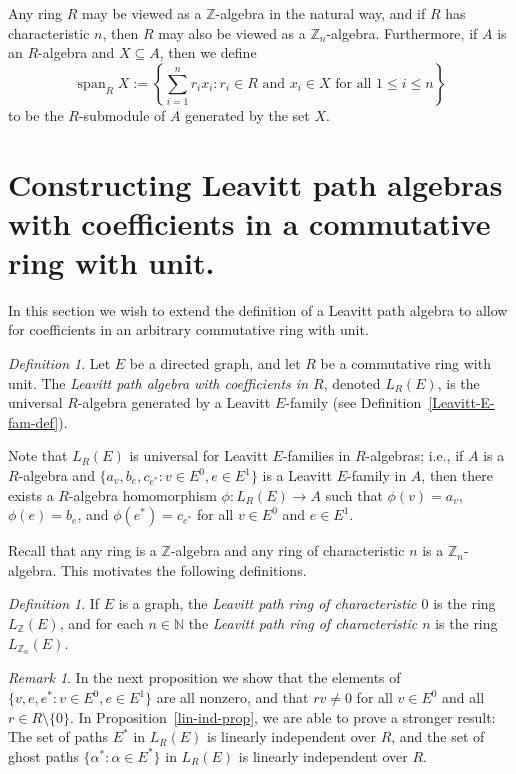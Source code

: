 \documentclass[11pt]{amsart}
\theoremstyle{remark}
\newtheorem{remark}[theorem]{Remark}
\newtheorem{definition}[theorem]{Definition}
\numberwithin{equation}{section}
\newcommand{\Z}{\mathbb{Z}}
\newcommand{\algspan}{\operatorname{span}}
\begin{document}
Any ring $R$ may be viewed as a $\Z$-algebra in the natural way, and if $R$ has characteristic $n$, then $R$ may also be viewed as a $\Z_n$-algebra.  Furthermore, if $A$ is an $R$-algebra and $X \subseteq A$, then we define $$\algspan_R X := \left\{ \sum_{i=1}^n r_i x_i : r_i \in R \text{ and } x_i \in X \text{ for all } 1 \leq i \leq n \right\}$$ to be the $R$-submodule of $A$ generated by the set $X$.



\section{Constructing Leavitt path algebras with coefficients in a commutative ring with unit.} \label{constr-sec}

In this section we wish to extend the definition of a Leavitt path algebra to allow for coefficients in an arbitrary commutative ring with unit.




\begin{definition} \label{fun-ring-def}
Let $E$ be a directed graph, and let $R$ be a commutative ring with unit.   The \emph{Leavitt path algebra with coefficients in $R$}, denoted $L_R(E)$, is the universal $R$-algebra generated by a Leavitt $E$-family (see Definition~\ref{Leavitt-E-fam-def}).
\end{definition}

Note that $L_R(E)$ is universal for Leavitt $E$-families in $R$-algebras; i.e., if $A$ is a $R$-algebra and $\{ a_v, b_e, c_{e^*}: v \in E^0, e \in E^1 \}$ is a Leavitt $E$-family in $A$, then there exists a $R$-algebra homomorphism $\phi : L_R(E) \to A$ such that $\phi(v) = a_v$, $\phi(e)=b_e$, and $\phi(e^*)=c_{e^*}$ for all $v \in E^0$ and $e \in E^1$. 

Recall that any ring is a $\Z$-algebra and any ring of characteristic $n$ is a $\Z_n$-algebra.  This motivates the following definitions.

\begin{definition} \label{fundamental-ring-def}
If $E$ is a graph, the \emph{Leavitt path ring of characteristic $0$} is the ring $L_\Z(E)$, and for each $n \in \mathbb{N}$ the \emph{Leavitt path ring of characteristic $n$} is the ring $L_{\Z_n}(E)$.
\end{definition}


\begin{remark}
In the next proposition we show that the elements of $\{ v, e, e^* : v \in E^0, e \in E^1 \}$ are all nonzero, and that $rv \neq 0$ for all $v \in E^0$ and all $r \in R \setminus \{ 0 \}$.  In Proposition~\ref{lin-ind-prop}, we are able to prove a stronger result: The set of paths $E^*$ in $L_R(E)$ is linearly independent over $R$, and the set of ghost paths $\{ \alpha^* : \alpha \in E^* \}$ in $L_R(E)$ is linearly independent over $R$.
\end{remark}
\end{document}

